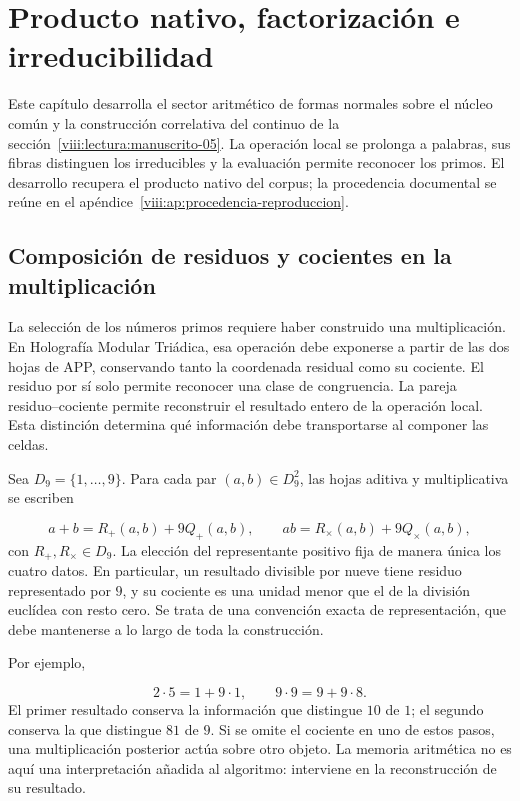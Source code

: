 \section{Producto nativo, factorización e irreducibilidad}
\label{viii:lectura:manuscrito-01}
Este capítulo desarrolla el sector aritmético de formas normales sobre el núcleo común y la construcción correlativa del continuo de la sección~\ref{viii:lectura:manuscrito-05}. La operación local se prolonga a palabras, sus fibras distinguen los irreducibles y la evaluación permite reconocer los primos. El desarrollo recupera el producto nativo del corpus; la procedencia documental se reúne en el apéndice~\ref{viii:ap:procedencia-reproduccion}.

\subsection{Composición de residuos y cocientes en la multiplicación}
La selección de los números primos requiere haber construido una multiplicación. En Holografía Modular Triádica, esa operación debe exponerse a partir de las dos hojas de APP, conservando tanto la coordenada residual como su cociente. El residuo por sí solo permite reconocer una clase de congruencia. La pareja residuo–cociente permite reconstruir el resultado entero de la operación local. Esta distinción determina qué información debe transportarse al componer las celdas.

Sea $D_9=\{1,\ldots,9\}$. Para cada par $(a,b)\in D_9^2$, las hojas aditiva y multiplicativa se escriben

\[
a+b=R_+(a,b)+9Q_+(a,b),\qquad
ab=R_\times(a,b)+9Q_\times(a,b),
\]
con $R_+,R_\times\in D_9$. La elección del representante positivo fija de manera única los cuatro datos. En particular, un resultado divisible por nueve tiene residuo representado por $9$, y su cociente es una unidad menor que el de la división euclídea con resto cero. Se trata de una convención exacta de representación, que debe mantenerse a lo largo de toda la construcción.

Por ejemplo,

\[
2\cdot5=1+9\cdot1,\qquad 9\cdot9=9+9\cdot8.
\]
El primer resultado conserva la información que distingue $10$ de $1$; el segundo conserva la que distingue $81$ de $9$. Si se omite el cociente en uno de estos pasos, una multiplicación posterior actúa sobre otro objeto. La memoria aritmética no es aquí una interpretación añadida al algoritmo: interviene en la reconstrucción de su resultado.

